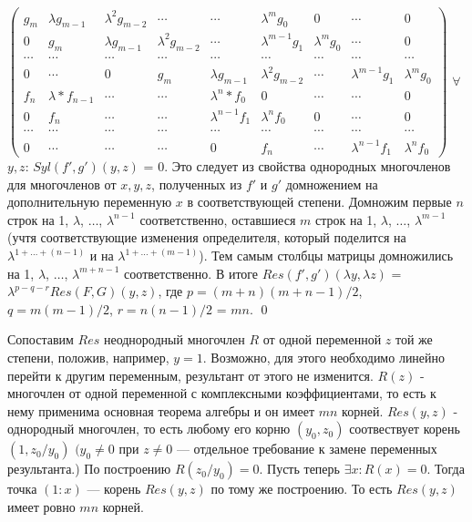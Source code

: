 \documentclass[a4paper, 12pt]{article}
\begin{document}
$\begin{pmatrix}
g_m & \lambda g_{m-1} & \lambda^{2} g_{m-2} & \cdots & \cdots & \lambda^{m}g_0 & 0 & \cdots & 0 \\
0 & g_m & \lambda g_{m-1} & \lambda^{2} g_{m-2} & \cdots & \lambda^{m-1} g_1 & \lambda^{m} g_0 & \cdots & 0 \\
\cdots & \cdots & \cdots & \cdots & \cdots & \cdots & \cdots & \cdots & \cdots \\
0 & \cdots & 0 & g_m & \lambda g_{m-1} & \lambda^{2} g_{m-2} & \cdots & \lambda^{m-1} g_1 & \lambda^{m} g_0 \\
f_n & \lambda*f_{n-1} & \cdots & \cdots & \lambda^{n}*f_0 & 0 & \cdots & \cdots & 0 \\
0 & f_n & \cdots & \cdots & \lambda^{n-1} f_1 & \lambda^{n} f_0 & 0 & \cdots & 0 \\
\cdots & \cdots & \cdots & \cdots & \cdots & \cdots & \cdots & \cdots & \cdots \\
0 & \cdots & \cdots & \cdots & 0 & f_n & \cdots & \lambda^{n-1} f_1 & \lambda^{n} f_0
\end{pmatrix}$\newline
$\forall$ $y,z$: $Syl(f',g')(y,z)$ = $0$. Это следует из свойства однородных многочленов для многочленов от $x,y,z$, полученных из $f'$ и $g'$ домножением на дополнительную переменную $x$ в соответствующей степени.
\smallskip
Домножим первые $n$ строк на 1, $\lambda$, $\dots$, $\lambda^{n-1}$ соответственно, оставшиеся $m$ строк на 1, $\lambda$, $\dots$, $\lambda^{m-1}$ (учтя соответствующие изменения определителя, который поделится на $\lambda^{1 +\dots + (n-1)}$ и на $\lambda^{1 +\dots + (m-1)}$).
Тем самым столбцы матрицы домножились на 1, $\lambda$, $\dots$, $\lambda^{m + n - 1}$ соответственно.\newline
В итоге $Res(f',g')(\lambda y,\lambda z)$ = $\lambda^{p-q-r}Res(F,G)(y,z)$, где $p = (m+n)(m+n-1)/2$, $q = m(m-1)/2 $, $r = n(n-1)/2$ = $mn$.
\qed

\bigskip
Сопоставим $Res$ неоднородный многочлен $R$ от одной переменной $z$ той же степени, положив, например, $y=1$. Возможно, для этого необходимо линейно перейти к другим переменным, результант от этого не изменится.\newline
$R(z)$ - многочлен от одной переменной с комплексными коэффициентами, то есть к нему применима основная теорема алгебры и он имеет $mn$ корней.\newline
$Res(y,z)$ - однородный многочлен, то есть любому его корню $(y_0, z_0)$ соотвествует корень $(1, z_0/y_0)$ $(y_0 \neq 0$ при $z \neq 0$ --- отдельное требование к замене переменных результанта.)
По построению $R(z_0/y_0) = 0$.\newline
Пусть теперь $\exists x: R(x) = 0$. Тогда точка $(1:x)$ --- корень $Res(y,z)$ по тому же построению.
То есть $Res(y,z)$ имеет ровно $mn$ корней.
\end{document}
